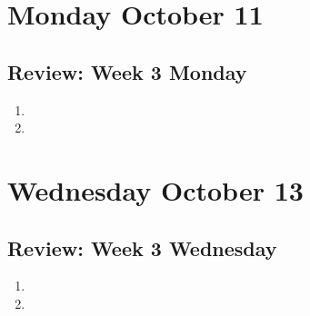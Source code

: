 

\section*{Monday October 11}



\newpage



\newpage


\vfill

\vfill

\vfill
\newpage
\subsection*{Review: Week 3 Monday}
\begin{enumerate}
    \item 
    \item 
\end{enumerate}
\newpage
\section*{Wednesday October 13}



\vfill

\newpage

\newpage

\newpage
\subsection*{Review: Week 3 Wednesday}
\begin{enumerate}
    \item 
    \item 
\end{enumerate}
\newpage
